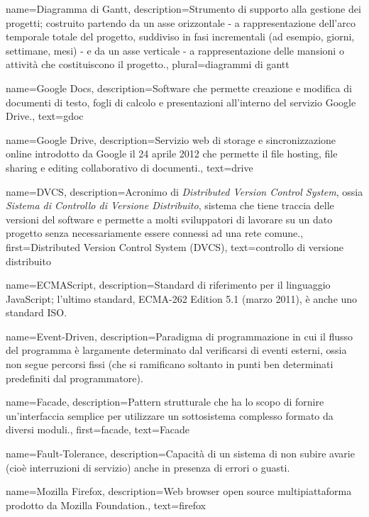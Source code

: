 {
name={Diagramma di Gantt},
description={Strumento di supporto alla gestione dei progetti; costruito partendo da un asse orizzontale - a rappresentazione dell'arco temporale totale del progetto, suddiviso in fasi incrementali (ad esempio, giorni, settimane, mesi) - e da un asse verticale - a rappresentazione delle mansioni o attività che costituiscono il progetto.},
plural={diagrammi di gantt}
}

{
name={Google Docs},
description={Software che permette creazione e modifica di documenti di testo, fogli di calcolo e presentazioni all'interno del servizio Google Drive.},
text={gdoc}
}

{
name={Google Drive},
description={Servizio web di storage e sincronizzazione online introdotto da Google il 24 aprile 2012 che permette il file hosting, file sharing e editing collaborativo di documenti.},
text={drive}
}

{
name={DVCS},
description={Acronimo di \textit{Distributed Version Control System}, ossia \textit{Sistema di Controllo di Versione Distribuito}, sistema che tiene traccia delle versioni del software e permette a molti sviluppatori di lavorare su un dato progetto senza necessariamente essere connessi ad una rete comune.},
first={Distributed Version Control System (DVCS)},
text={controllo di versione distribuito}
}

{
name={ECMAScript},
description={Standard di riferimento per il linguaggio JavaScript; l'ultimo standard, ECMA-262 Edition 5.1 (marzo 2011), è anche uno standard ISO.}
}

{
name={Event-Driven},
description={Paradigma di programmazione in cui il flusso del programma è largamente determinato dal verificarsi di eventi esterni, ossia non segue percorsi fissi (che si ramificano soltanto in punti ben determinati predefiniti dal programmatore).}
}

{
name={Facade},
description={Pattern strutturale che ha lo scopo di fornire un'interfaccia semplice per utilizzare un sottosistema complesso formato da diversi moduli.},
first={facade},
text={Facade}
}

{
name={Fault-Tolerance},
description={Capacità di un sistema di non subire avarie (cioè interruzioni di servizio) anche in presenza di errori o guasti.}
}

{
name={Mozilla Firefox},
description={Web browser open source multipiattaforma prodotto da Mozilla Foundation.},
text={firefox}
}

